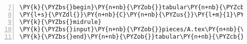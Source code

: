 \begin{Verbatim}[commandchars=\\\{\},numbers=left,numbersep=0.5em,firstnumber=7]
\PY{k}{\PYZbs{}begin}\PY{n+nb}{\PYZob{}}tabular\PY{n+nb}{\PYZcb{}}\PY{n+nb}{\PYZob{}}c c c\PY{n+nb}{\PYZcb{}}
\PY{l+s}{\PYZdl{}}\PY{n+nb}{C}\PY{n+nb}{\PYZus{}}\PY{l+m}{1}\PY{l+s}{\PYZdl{}} \PY{n+nb}{\PYZam{}} \PY{l+s}{\PYZdl{}}\PY{n+nb}{C}\PY{n+nb}{\PYZus{}}\PY{l+m}{2}\PY{l+s}{\PYZdl{}} \PY{n+nb}{\PYZam{}} \PY{l+s}{\PYZdl{}}\PY{n+nb}{C}\PY{n+nb}{\PYZus{}}\PY{l+m}{3}\PY{l+s}{\PYZdl{}} \PY{k}{\PYZbs{}\PYZbs{}}
\PY{k}{\PYZbs{}midrule}
\PY{k}{\PYZbs{}input}\PY{n+nb}{\PYZob{}}pieces/A.tex\PY{n+nb}{\PYZcb{}}
\PY{k}{\PYZbs{}end}\PY{n+nb}{\PYZob{}}tabular\PY{n+nb}{\PYZcb{}}
\end{Verbatim}
